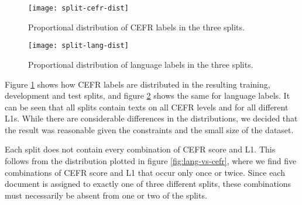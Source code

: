 \begin{figure}
  \centering
  \texttt{[image: split-cefr-dist]}
  \caption{Proportional distribution of CEFR labels in the three splits.}
  \label{fig:split-cefr-dist}
\end{figure}

\begin{figure}
  \centering
  \texttt{[image: split-lang-dist]}
  \caption{Proportional distribution of language labels in the three splits.}
  \label{fig:split-lang-dist}
\end{figure}

Figure \ref{fig:split-cefr-dist} shows how CEFR labels are distributed in the
resulting training, development and test splits, and figure
\ref{fig:split-lang-dist} shows the same for language labels. It can be seen
that all splits contain texts on all CEFR levels and for all different
\acp{L1}. While there are considerable differences in the distributions, we
decided that the result was reasonable given the constraints and the small
size of the dataset.

Each split does not contain every combination of CEFR score and \ac{L1}. This
follows from the distribution plotted in figure \ref{fig:lang-vs-cefr}, where
we find five combinations of CEFR score and \ac{L1} that occur only once or
twice. Since each document is assigned to exactly one of three different
splits, these combinations must necessarily be absent from one or two of the
splits.
